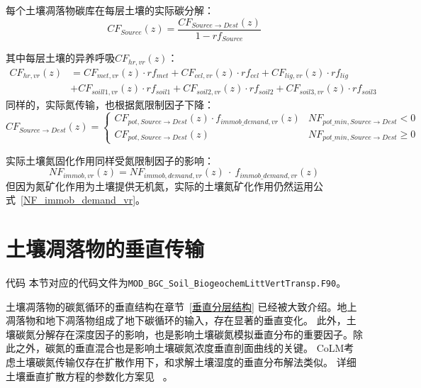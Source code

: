 每个土壤凋落物碳库在每层土壤的实际碳分解：
\begin{equation}
CF_{Source}(z)=\frac{CF_{Source \rightarrow { Dest }}(z)}{1-r f_{Source}}
\end{equation}

其中每层土壤的异养呼吸$CF_{hr,vr}\left(z\right)$：
\begin{equation}
\begin{aligned}
C F_{h r, vr}(z)&=C F_{met, vr}(z) \cdot r f_{met}+C F_{cel, vr}(z) \cdot r f_{cel}+C F_{lig, vr}(z) \cdot r f_{lig} \\ 
&+C F_{{soill } 1, vr}(z) \cdot r f_{{soil1 }}+C F_{{soil2,vr }}(z) \cdot r f_{{soil2 }}+C F_{{soil3,vr }}(z) \cdot r f_{{soil3 }}
\end{aligned}
\end{equation}
同样的，实际氮传输，也根据氮限制因子下降：
\begin{equation}
    CF_{Source \rightarrow Dest}(z)=\left\{\begin{array}{ll} CF_{pot, Source \rightarrow Dest}(z) \cdot f_{immob\_demand, vr}(z) & NF_{pot\_{min, Source \rightarrow Dest}} <0 \\ 
    CF_{pot, Source \rightarrow Dest}(z) & NF_{pot\_{min, Source\rightarrow Dest}} \geqslant 0
   \end{array}\right.
\end{equation}

实际土壤氮固化作用同样受氮限制因子的影响：
\begin{equation}
NF_{immob,vr}(z)=NF_{immob,demand,vr}(z)\ \cdot\ f_{immob\_{demand},vr}(z)
\end{equation}
但因为氮矿化作用为土壤提供无机氮，实际的土壤氮矿化作用仍然运用公式~\eqref{NF_immob_demand_vr}。


\section{土壤凋落物的垂直传输}\label{土壤凋落物的垂直传输}
\begin{mymdframed}{代码}
本节对应的代码文件为\texttt{MOD\_BGC\_Soil\_BiogeochemLittVertTransp.F90}。
\end{mymdframed}
土壤凋落物的碳氮循环的垂直结构在章节~\ref{垂直分层结构} 已经被大致介绍。地上凋落物和地下凋落物组成了地下碳循环的输入，存在显著的垂直变化。
此外，土壤碳氮分解存在深度因子的影响，也是影响土壤碳氮模拟垂直分布的重要因子。除此之外，碳氮的垂直混合也是影响土壤碳氮浓度垂直剖面曲线的关键。
CoLM考虑土壤碳氮传输仅存在扩散作用下，和求解土壤湿度的垂直分布解法类似。
详细土壤垂直扩散方程的参数化方案见~\citet{koven2009formation,koven2011permafrost,koven2013effect,koven2015permafrost} 。
